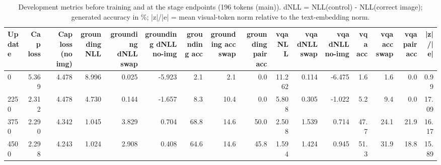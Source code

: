 \begin{table}[t]
\centering
\small
\caption{Development metrics before training and at the stage endpoints (196 tokens (main)). dNLL = NLL(control) - NLL(correct image); generated accuracy in \%; |z|/|e| = mean visual-token norm relative to the text-embedding norm.}
\label{tab:t2_t5_dev_by_stage_main}
\begin{tabular}{lrrrrrrrrrrrrrrr}
\toprule
Update & Cap loss & Cap loss (no img) & grounding NLL & grounding dNLL swap & grounding dNLL no-img & grounding acc & grounding acc swap & grounding pair acc & vqa NLL & vqa dNLL swap & vqa dNLL no-img & vqa acc & vqa acc swap & vqa pair acc & |z|/|e| \\
\midrule
0 & 5.369 & 4.478 & 8.996 & 0.025 & -5.923 & 2.1 & 2.1 & 0.0 & 11.262 & 0.114 & -6.475 & 1.6 & 1.6 & 0.0 & 0.99 \\
2250 & 2.312 & 4.478 & 4.730 & 0.144 & -1.657 & 8.3 & 10.4 & 0.0 & 5.808 & 0.305 & -1.022 & 5.2 & 9.4 & 0.0 & 17.09 \\
3750 & 2.290 & 4.342 & 1.045 & 3.829 & 0.704 & 68.8 & 14.6 & 50.0 & 2.508 & 1.539 & 0.714 & 47.7 & 24.1 & 21.9 & 16.17 \\
4500 & 2.298 & 4.243 & 1.024 & 2.908 & 0.408 & 64.6 & 14.6 & 45.8 & 1.594 & 1.424 & 0.945 & 51.3 & 31.9 & 18.8 & 15.89 \\
\bottomrule
\end{tabular}
\end{table}
